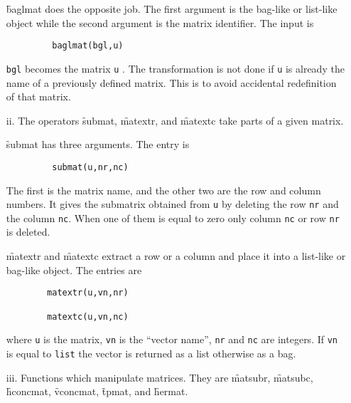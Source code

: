\begin{itemize}
\hypertarget{operator:BAGLMAT}{}
\f{baglmat} does the opposite job. The first argument is the
bag-like or list-like object while the second argument is the matrix
identifier. The input is
\begin{verbatim}
         baglmat(bgl,u)
\end{verbatim}
\texttt {bgl} becomes the matrix \texttt{u} . The transformation is
not done if \texttt{u}  is already the  name of a
previously  defined matrix. This is to avoid accidental redefinition
of that matrix.
\item[ii.]
\hypertarget{operator:SUBMAT}{}
\hypertarget{operator:MATEXTR}{}
\hypertarget{operator:MATEXTC}{}
The operators \f{submat}, \f{matextr}, and \f{matextc} take parts of a given matrix.

\f{submat} has three arguments. The entry is
\begin{verbatim}
         submat(u,nr,nc)
\end{verbatim}
The first is the matrix name, and the other two are the row  and column
numbers.  It gives the
submatrix obtained from \texttt{u} by deleting the row \texttt{nr} and
the column \texttt{nc}.
When one of them is equal to zero only column \texttt{nc}
or row \texttt{nr} is deleted.

\f{matextr} and \f{matextc} extract a row or a column and place it into
a list-like or bag-like object.
The entries are
\begin{verbatim}
        matextr(u,vn,nr)

        matextc(u,vn,nc)
\end{verbatim}
where \texttt{u} is the matrix,  \texttt{vn} is the ``vector name'',
\texttt{nr}  and \texttt{nc} are integers.  If \texttt{vn} is equal
to \texttt{list} the vector is returned as a list otherwise as a bag.
\item[iii.]
\hypertarget{operator:MATSUBR}{}
\hypertarget{operator:MATSUBC}{}
\hypertarget{operator:HCONCMAT}{}
\hypertarget{operator:VCONCMAT}{}
\hypertarget{operator:TPMAT}{}
\hypertarget{operator:HERMAT}{}
Functions which manipulate matrices. They are
\f{matsubr}, \f{matsubc}, \f{hconcmat}, \f{vconcmat}, \f{tpmat}, and \f{hermat}.


\end{itemize}

